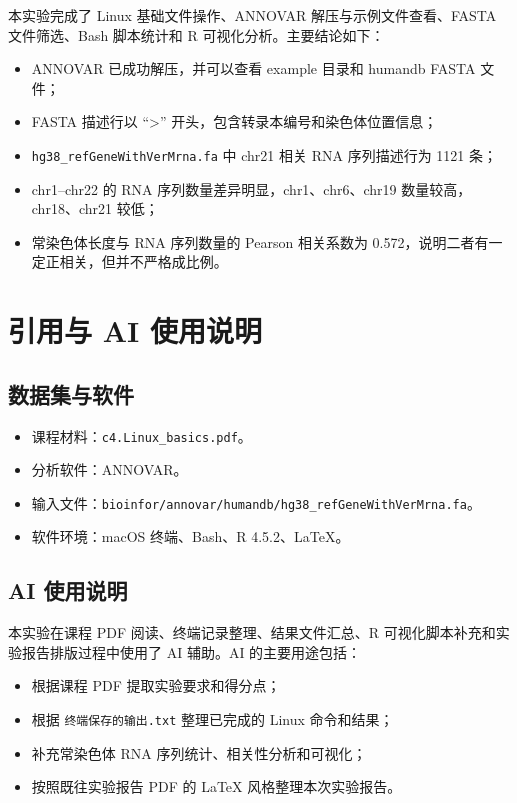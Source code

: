 \documentclass[12pt,a4paper,fontset=fandol]{ctexart}
\begin{document}
本实验完成了 Linux 基础文件操作、ANNOVAR 解压与示例文件查看、FASTA 文件筛选、Bash 脚本统计和 R 可视化分析。主要结论如下：

\begin{itemize}
  \item ANNOVAR 已成功解压，并可以查看 example 目录和 humandb FASTA 文件；
  \item FASTA 描述行以 ``>'' 开头，包含转录本编号和染色体位置信息；
  \item \texttt{hg38\_refGeneWithVerMrna.fa} 中 chr21 相关 RNA 序列描述行为 1121 条；
  \item chr1--chr22 的 RNA 序列数量差异明显，chr1、chr6、chr19 数量较高，chr18、chr21 较低；
  \item 常染色体长度与 RNA 序列数量的 Pearson 相关系数为 0.572，说明二者有一定正相关，但并不严格成比例。
\end{itemize}

\section{引用与 AI 使用说明}

\subsection{数据集与软件}

\begin{itemize}
  \item 课程材料：\texttt{c4.Linux\_basics.pdf}。
  \item 分析软件：ANNOVAR。
  \item 输入文件：\texttt{bioinfor/annovar/humandb/hg38\_refGeneWithVerMrna.fa}。
  \item 软件环境：macOS 终端、Bash、R 4.5.2、\LaTeX。
\end{itemize}

\subsection{AI 使用说明}

本实验在课程 PDF 阅读、终端记录整理、结果文件汇总、R 可视化脚本补充和实验报告排版过程中使用了 AI 辅助。AI 的主要用途包括：

\begin{itemize}
  \item 根据课程 PDF 提取实验要求和得分点；
  \item 根据 \texttt{终端保存的输出.txt} 整理已完成的 Linux 命令和结果；
  \item 补充常染色体 RNA 序列统计、相关性分析和可视化；
  \item 按照既往实验报告 PDF 的 LaTeX 风格整理本次实验报告。
\end{itemize}
\end{document}
